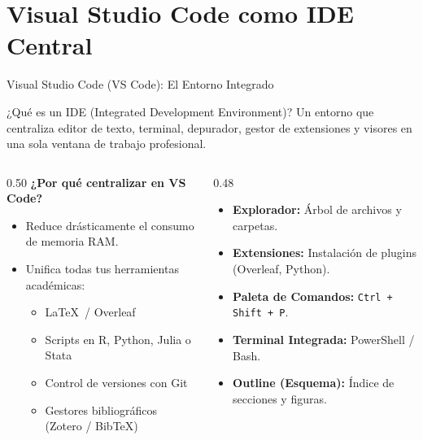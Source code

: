 \documentclass[aspectratio=169, 10pt]{beamer}
\begin{document}
\section[VS Code]{Visual Studio Code como IDE Central}

\begin{frame}{Visual Studio Code (VS Code): El Entorno Integrado}
  \begin{block}{¿Qué es un IDE (Integrated Development Environment)?}
    \small
    Un entorno que centraliza editor de texto, terminal, depurador, gestor de extensiones y visores en una sola ventana de trabajo profesional.
  \end{block}

  \vspace{0.1cm}
  \begin{columns}[T]
    \begin{column}{0.50\textwidth}
      \textbf{\small ¿Por qué centralizar en VS Code?}
      \small
      \begin{itemize}
        \item Reduce drásticamente el consumo de memoria RAM.
        \item Unifica todas tus herramientas académicas:
        \begin{itemize}\footnotesize
          \item \LaTeX\ / Overleaf
          \item Scripts en R, Python, Julia o Stata
          \item Control de versiones con Git
          \item Gestores bibliográficos (Zotero / BibTeX)
        \end{itemize}
      \end{itemize}
    \end{column}

    \begin{column}{0.48\textwidth}
      \begin{tcolorbox}[colback=pucpGray,colframe=pucpBlue,title=\textbf{Paneles Clave en VS Code},fonttitle=\bfseries\scriptsize,boxrule=0.6pt,top=1.5mm,bottom=1.5mm]
        \scriptsize
        \begin{itemize}
          \item \textbf{Explorador:} Árbol de archivos y carpetas.
          \item \textbf{Extensiones:} Instalación de plugins (Overleaf, Python).
          \item \textbf{Paleta de Comandos:} \texttt{Ctrl + Shift + P}.
          \item \textbf{Terminal Integrada:} PowerShell / Bash.
          \item \textbf{Outline (Esquema):} Índice de secciones y figuras.
        \end{itemize}
      \end{tcolorbox}
    \end{column}
  \end{columns}
\end{frame}
\end{document}

